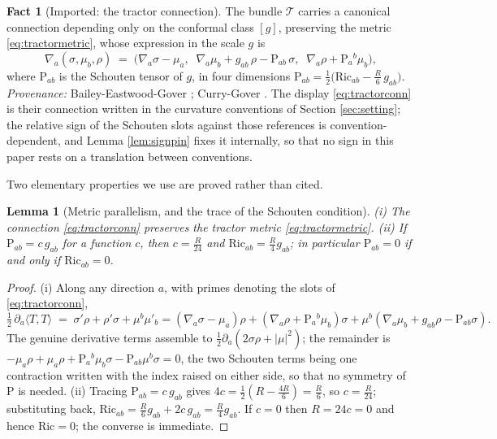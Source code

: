 \documentclass[11pt]{article}
\newtheorem{lemma}[theorem]{Lemma}
\theoremstyle{definition}
\newtheorem{fact}[theorem]{Fact}
\newcommand{\Ric}{\mathrm{Ric}}
\newcommand{\Sch}{\mathrm{P}}
\newcommand{\ip}[2]{\langle #1, #2\rangle}
\begin{document}
\begin{fact}[Imported: the tractor connection]\label{fact:tractor}
The bundle $\mathcal{T}$ carries a canonical connection depending only on the conformal class $[g]$, preserving the metric \eqref{eq:tractormetric}, whose expression in the scale $g$ is
\begin{equation}\label{eq:tractorconn}
\nabla_a(\sigma, \mu_b, \rho) \;=\; \bigl(\nabla_a\sigma - \mu_a,\;\; \nabla_a\mu_b + g_{ab}\,\rho - \Sch_{ab}\,\sigma,\;\; \nabla_a\rho + \Sch_a{}^{b}\mu_b\bigr),
\end{equation}
where $\Sch_{ab}$ is the Schouten tensor of $g$, in four dimensions $\Sch_{ab} = \tfrac12\bigl(\Ric_{ab} - \tfrac{R}{6}\,g_{ab}\bigr)$. \emph{Provenance:} Bailey-Eastwood-Gover \cite{BEG1994}; Curry-Gover \cite[\S 5]{CurryGover2018}. The display \eqref{eq:tractorconn} is their connection written in the curvature conventions of Section \ref{sec:setting}; the relative sign of the Schouten slots against those references is convention-dependent, and Lemma \ref{lem:signpin} fixes it internally, so that no sign in this paper rests on a translation between conventions.
\end{fact}

Two elementary properties we use are proved rather than cited.

\begin{lemma}[Metric parallelism, and the trace of the Schouten condition]\label{lem:elementary}
(i) The connection \eqref{eq:tractorconn} preserves the tractor metric \eqref{eq:tractormetric}. (ii) If $\Sch_{ab} = c\, g_{ab}$ for a function $c$, then $c = \tfrac{R}{24}$ and $\Ric_{ab} = \tfrac{R}{4} g_{ab}$; in particular $\Sch_{ab} = 0$ if and only if $\Ric_{ab} = 0$.
\end{lemma}

\begin{proof}
(i) Along any direction $a$, with primes denoting the slots of \eqref{eq:tractorconn},
\[
\tfrac12\,\partial_a \ip{T}{T} \;=\; \sigma'\rho + \rho'\sigma + \mu^b\mu'_b
= (\nabla_a\sigma - \mu_a)\rho + (\nabla_a\rho + \Sch_a{}^b\mu_b)\sigma + \mu^b(\nabla_a\mu_b + g_{ab}\rho - \Sch_{ab}\sigma).
\]
The genuine derivative terms assemble to $\tfrac12\partial_a(2\sigma\rho + |\mu|^2)$; the remainder is $-\mu_a\rho + \mu_a \rho + \Sch_a{}^b\mu_b\sigma - \Sch_{ab}\mu^b\sigma = 0$, the two Schouten terms being one contraction written with the index raised on either side, so that no symmetry of $\Sch$ is needed.
(ii) Tracing $\Sch_{ab} = c\,g_{ab}$ gives $4c = \tfrac12(R - \tfrac{4R}{6}) = \tfrac{R}{6}$, so $c = \tfrac{R}{24}$; substituting back, $\Ric_{ab} = \tfrac{R}{6}g_{ab} + 2c\,g_{ab} = \tfrac{R}{4}g_{ab}$. If $c = 0$ then $R = 24c = 0$ and hence $\Ric = 0$; the converse is immediate.
\end{proof}
\end{document}
